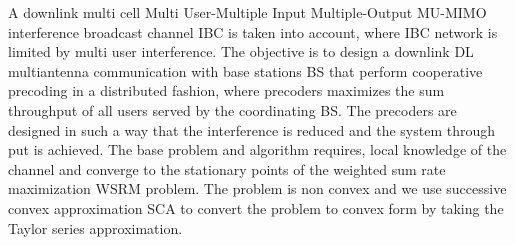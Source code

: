 
A downlink multi cell Multi User-Multiple Input Multiple-Output \ac{MU-MIMO} interference broadcast channel \ac{IBC}  is taken into account, where \ac{IBC} network is limited by multi user interference. The objective is to design a downlink \ac{DL} multiantenna communication with base stations \ac{BS} that perform cooperative precoding in a distributed fashion, where precoders maximizes the sum throughput of all users served by the coordinating \ac{BS}. The precoders are designed in such a way that the interference is reduced and the system through put is achieved. The base problem and algorithm requires, local knowledge of the channel and converge to the stationary points of the weighted sum rate maximization \ac{WSRM} problem. The problem is non convex and we use successive convex approximation \ac{SCA} to convert the problem to convex form by taking the Taylor series approximation.
 
